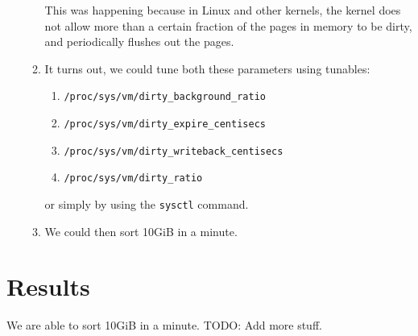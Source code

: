 \documentclass{article}
\begin{document}
\begin{enumerate}
\begin{enumerate}
	This was happening because in Linux and other kernels, the kernel does not allow more than
	a certain fraction of the pages in memory to be dirty, and periodically flushes out the
	pages.
	\item It turns out, we could tune both these parameters using tunables:
          \begin{enumerate}
          \item \verb#/proc/sys/vm/dirty_background_ratio#
	  \item \verb#/proc/sys/vm/dirty_expire_centisecs# 
          \item \verb#/proc/sys/vm/dirty_writeback_centisecs# 
	  \item \verb#/proc/sys/vm/dirty_ratio#
          \end{enumerate}
          or simply by using the \verb#sysctl# command.
	\item We could then sort 10GiB in a minute.
	\end{enumerate}
\end{enumerate}

\section{Results}
We are able to sort 10GiB in a minute. TODO: Add more stuff.
\end{document}
